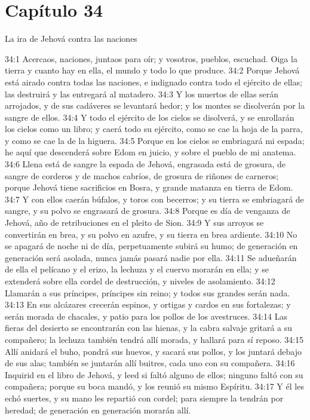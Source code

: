 \section*{Capítulo 34 }
La ira de Jehová contra las naciones 
 
34:1 Acercaos, naciones, juntaos para oír; y vosotros, pueblos, escuchad. Oiga la tierra y cuanto hay en ella, el mundo y todo lo que produce. 
34:2 Porque Jehová está airado contra todas las naciones, e indignado contra todo el ejército de ellas; las destruirá y las entregará al matadero. 
34:3 Y los muertos de ellas serán arrojados, y de sus cadáveres se levantará hedor; y los montes se disolverán por la sangre de ellos. 
34:4 Y todo el ejército de los cielos se disolverá, y se enrollarán los cielos como un libro; y caerá todo su ejército, como se cae la hoja de la parra, y como se cae la de la higuera. 
34:5 Porque en los cielos se embriagará mi espada; he aquí que descenderá sobre Edom en juicio, y sobre el pueblo de mi anatema. 
34:6 Llena está de sangre la espada de Jehová, engrasada está de grosura, de sangre de corderos y de machos cabríos, de grosura de riñones de carneros; porque Jehová tiene sacrificios en Bosra, y grande matanza en tierra de Edom. 
34:7 Y con ellos caerán búfalos, y toros con becerros; y su tierra se embriagará de sangre, y su polvo se engrasará de grosura. 
34:8 Porque es día de venganza de Jehová, año de retribuciones en el pleito de Sion. 
34:9 Y sus arroyos se convertirán en brea, y su polvo en azufre, y su tierra en brea ardiente. 
34:10 No se apagará de noche ni de día, perpetuamente subirá su humo; de generación en generación será asolada, nunca jamás pasará nadie por ella. 
34:11 Se adueñarán de ella el pelícano y el erizo, la lechuza y el cuervo morarán en ella; y se extenderá sobre ella cordel de destrucción, y niveles de asolamiento. 
34:12 Llamarán a sus príncipes, príncipes sin reino; y todos sus grandes serán nada. 
34:13 En sus alcázares crecerán espinos, y ortigas y cardos en sus fortalezas; y serán morada de chacales, y patio para los pollos de los avestruces. 
34:14 Las fieras del desierto se encontrarán con las hienas, y la cabra salvaje gritará a su compañero; la lechuza también tendrá allí morada, y hallará para sí reposo. 
34:15 Allí anidará el buho, pondrá sus huevos, y sacará sus pollos, y los juntará debajo de sus alas; también se juntarán allí buitres, cada uno con su compañera. 
34:16 Inquirid en el libro de Jehová, y leed si faltó alguno de ellos; ninguno faltó con su compañera; porque su boca mandó, y los reunió su mismo Espíritu. 
34:17 Y él les echó suertes, y su mano les repartió con cordel; para siempre la tendrán por heredad; de generación en generación morarán allí. 
